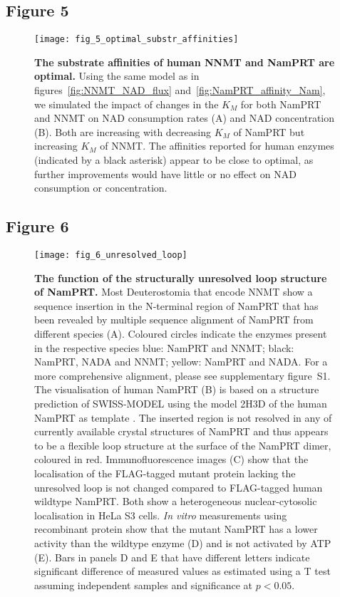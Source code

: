 \newpage


\subsection*{Figure 5}

\begin{figure}[ht]
  \centering
  \texttt{[image: fig\_5\_optimal\_substr\_affinities]}
  \caption{\textbf{The substrate affinities of human NNMT and NamPRT are optimal.} Using the same model as in figures~\ref{fig:NNMT_NAD_flux} and~\ref{fig:NamPRT_affinity_Nam}, we simulated the impact of changes in the $K_{M}$ for both NamPRT and NNMT on NAD consumption rates (A) and NAD concentration (B). Both are increasing with decreasing $K_{M}$ of NamPRT but increasing $K_{M}$ of NNMT. The affinities reported for human enzymes (indicated by a black asterisk) appear to be close to optimal, as further improvements would have little or no effect on NAD consumption or concentration.}
  \label{fig:optimal_substr_affinities}
\end{figure}

\newpage


\subsection*{Figure 6}

\begin{figure}[ht]
  \centering
  \texttt{[image: fig\_6\_unresolved\_loop]}
  \caption{\textbf{The function of the structurally unresolved loop structure of NamPRT.} Most Deuterostomia that encode NNMT show a sequence insertion in the N-terminal region of NamPRT that has been revealed by multiple sequence alignment of NamPRT from different species (A). Coloured circles indicate the enzymes present in the respective species blue: NamPRT and NNMT; black: NamPRT, NADA and NNMT; yellow: NamPRT and NADA. For a more comprehensive alignment, please see supplementary figure~S1. The visualisation of human NamPRT (B) is based on a structure prediction of SWISS-MODEL \cite{Arnold2006,Biasini2014} using the model 2H3D of the human NamPRT as template \cite{Wang2006}. The inserted region is not resolved in any of currently available crystal structures of NamPRT and thus appears to be a flexible loop structure at the surface of the NamPRT dimer, coloured in red. Immunofluorescence images (C) show that the localisation of the FLAG-tagged mutant protein lacking the unresolved loop  is not changed compared to FLAG-tagged human wildtype NamPRT. Both show a heterogeneous nuclear-cytosolic localisation in HeLa S3 cells. \textit{In vitro} measurements using recombinant protein show that the mutant NamPRT has a lower activity than the wildtype enzyme (D) and is not activated by ATP (E). Bars in panels D and E that have different letters indicate significant difference of measured values as estimated using a T test assuming independent samples and significance at $p < 0.05$.}
  \label{fig:unresolved_loop}
\end{figure}

